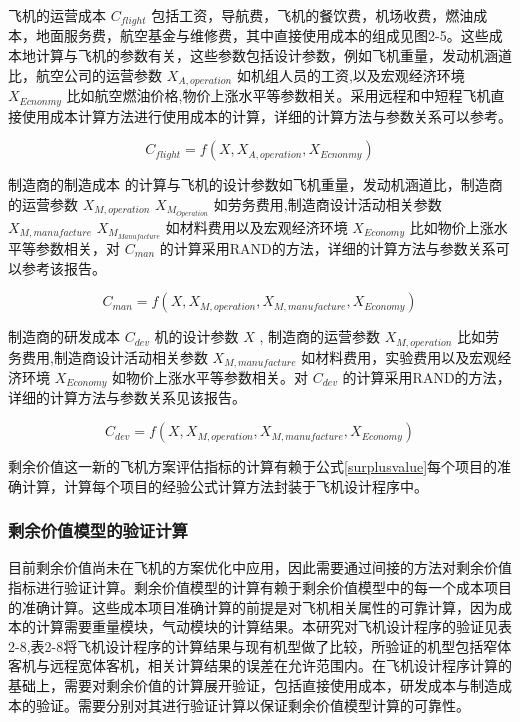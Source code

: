 \documentclass[12pt,a4paper]{report}
\begin{document}
飞机的运营成本 $ C_{flight} $ 包括工资，导航费，飞机的餐饮费，机场收费，燃油成本，地面服务费，航空基金与维修费，其中直接使用成本的组成见图2-5。这些成本地计算与飞机的参数有关，这些参数包括设计参数，例如飞机重量，发动机涵道比，航空公司的运营参数 $ X_{A,operation} $ 如机组人员的工资,以及宏观经济环境 $ X_{Ecnonmy} $ 比如航空燃油价格,物价上涨水平等参数相关。采用远程和中短程飞机直接使用成本计算方法进行使用成本的计算，详细的计算方法与参数关系可以参考。

\begin{equation}
\label{operationcost}
{{C}_{flight}}=f\left( X,{{X}_{A,operation}},{{X}_{Ecnonmy}} \right)
\end{equation}

制造商的制造成本 的计算与飞机的设计参数如飞机重量，发动机涵道比，制造商的运营参数  $ X_{M,operation} $  $ X_{M_{Operation}} $ 如劳务费用,制造商设计活动相关参数 $ X_{M,manufacture} $  $ X_{M_{Manufacture}} $ 如材料费用以及宏观经济环境 $ X_{Economy} $ 比如物价上涨水平等参数相关，对 $ C_{man} $ 的计算采用RAND的方法\cite{levenson1972cost}，详细的计算方法与参数关系可以参考该报告。

\begin{equation}
\label{manufacturecost}
{{C}_{man}}=f\left( X,{{X}_{M,operation}},{{X}_{M,manufacture}},{{X}_{Economy}} \right)
\end{equation}

制造商的研发成本 $C_{dev} $ 机的设计参数 $ X $ , 制造商的运营参数 $ X_{M,operation} $ 比如劳务费用,制造商设计活动相关参数 $ X_{M,manufacture} $ 如材料费用，实验费用以及宏观经济环境 $ X_{Economy} $ 如物价上涨水平等参数相关。对 $ C_{dev} $ 的计算采用RAND的方法\cite{levenson1972cost}，详细的计算方法与参数关系见该报告。

\begin{equation}
\label{randcost}
{{C}_{dev}}=f\left( X,{{X}_{M,operation}},{{X}_{M,manufacture}},{{X}_{Economy}} \right)
\end{equation}

剩余价值这一新的飞机方案评估指标的计算有赖于公式\ref{surplusvalue}每个项目的准确计算，计算每个项目的经验公式计算方法封装于飞机设计程序中。

\subsubsection{剩余价值模型的验证计算}

目前剩余价值尚未在飞机的方案优化中应用，因此需要通过间接的方法对剩余价值指标进行验证计算。剩余价值模型的计算有赖于剩余价值模型中的每一个成本项目的准确计算。这些成本项目准确计算的前提是对飞机相关属性的可靠计算，因为成本的计算需要重量模块，气动模块的计算结果。本研究对飞机设计程序的验证见表2-8,表2-8将飞机设计程序的计算结果与现有机型做了比较，所验证的机型包括窄体客机与远程宽体客机，相关计算结果的误差在允许范围内。在飞机设计程序计算的基础上，需要对剩余价值的计算展开验证，包括直接使用成本，研发成本与制造成本的验证。需要分别对其进行验证计算以保证剩余价值模型计算的可靠性。
\end{document}
